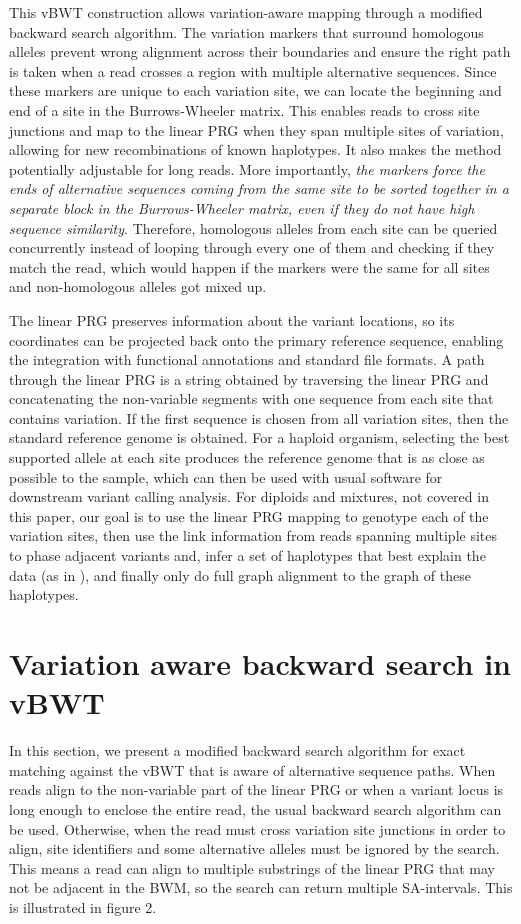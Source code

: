 \documentclass[runningheads,a4paper]{llncs}
\begin{document}
This vBWT construction allows variation-aware mapping through a modified backward search algorithm. The variation markers that surround homologous alleles prevent wrong alignment across their boundaries and ensure the right path is taken when a read crosses a region with multiple alternative sequences. Since these markers are unique to each variation site, we can locate the beginning and end of a site in the Burrows-Wheeler matrix. This enables reads to cross site junctions and map to the linear PRG when they span multiple sites of variation, allowing for new recombinations of known haplotypes. It also makes the method potentially adjustable for long reads. More importantly, \textit{the markers force the ends of alternative sequences coming from the same site to be sorted together in a separate block in the Burrows-Wheeler matrix, even if they do not have high sequence similarity}. Therefore, homologous alleles from each site can be queried concurrently instead of looping through every one of them and checking if they match the read, which would happen if the markers were the same for all sites and non-homologous alleles got mixed up. 

The linear PRG preserves information about the variant locations, so its coordinates can be projected back onto the primary reference sequence, enabling the integration with functional annotations and standard file formats. A path through the linear PRG is a string obtained by traversing the linear PRG and concatenating the non-variable segments with one sequence from each site that contains variation. If the first sequence is chosen from all variation sites, then the standard reference genome is obtained. For a haploid organism, selecting the best supported allele at each site produces the reference genome that is as close as possible to the sample, which can then be used with usual software for downstream variant calling analysis. For diploids and mixtures, not covered in this paper, our goal is to use the linear PRG mapping to genotype each of the variation sites, then use the link information from reads spanning multiple sites to phase adjacent variants and, infer a set of haplotypes that best explain the data (as in \cite{dilthey}), and finally only do full graph alignment to the graph of these haplotypes. 


\section{Variation aware backward search in vBWT}
In this section, we present a modified backward search algorithm for exact matching against the vBWT that is aware of alternative sequence paths. When reads align to the non-variable part of the linear PRG or when a variant locus is long enough to enclose the entire read, the usual backward search algorithm can be used. Otherwise, when the read must cross variation site junctions in order to align, site identifiers and some alternative alleles must be ignored by the search. This means a read can align to multiple substrings of the linear PRG that may not be adjacent in the BWM, so the search can return multiple SA-intervals. This is illustrated in figure 2.
\end{document}
